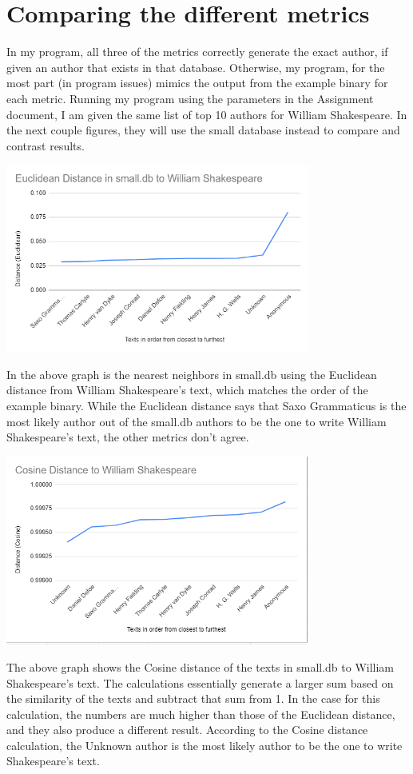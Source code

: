 \documentclass[11pt]{article}
\begin{document}
\section{Comparing the different metrics}\label{ss:metrics}
In my program, all three of the metrics correctly generate the exact author, if given an author that exists in that database. Otherwise, my program, for the most part (in program issues) mimics the output from the example binary for each metric. Running my program using the parameters in the Assignment document, I am given the same list of top 10 authors for William Shakespeare. In the next couple figures, they will use the small database instead to compare and contrast results.

\includegraphics[width = 0.75\textwidth]{Graphs/Euclidean.PNG}

In the above graph is the nearest neighbors in small.db using the Euclidean distance from William Shakespeare's text, which matches the order of the example binary. While the Euclidean distance says that Saxo Grammaticus is the most likely author out of the small.db authors to be the one to write William Shakespeare's text, the other metrics don't agree.

\includegraphics[width = 0.75\textwidth]{Graphs/Cosine.PNG}

The above graph shows the Cosine distance of the texts in small.db to William Shakespeare's text. The calculations essentially generate a larger sum based on the similarity of the texts and subtract that sum from 1. In the case for this calculation, the numbers are much higher than those of the Euclidean distance, and they also produce a different result. According to the Cosine distance calculation, the Unknown author is the most likely author to be the one to write Shakespeare's text.
\end{document}

